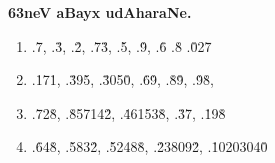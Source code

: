 \begin{center}
{\bf\large 63neV aBayx udAharaNe.}
\end{center}

\begin{enumerate}[\rm(1)]
\item .{\rm \.{7}, .\.{3}, .\.{2}, .\.{7}\.{3}, .\.{5}, .\.{9}, .\.{6} .\.{8} .\.{0}2\.{7}}

\item .{\rm \.{1}7\.{1}, .\.{3}9\.{5}, .\.{3}05\.{0}, .\.{6}\.{9}, .\.{8}\.{9}, .\.{9}\.{8},}

\item .{\rm \.{7}2\.{8}, .\.{8}5714\.{2}, .\.{4}6153\.{8}, .\.{3}\.{7}, .\.{1}9\.{8}}

\item .{\rm \.{6}4\.{8}, .\.{5}83\.{2}, .\.{5}248\.{8}, .\.{2}3809\.{2}, .\.{1}020304\.{0}}
\end{enumerate}
